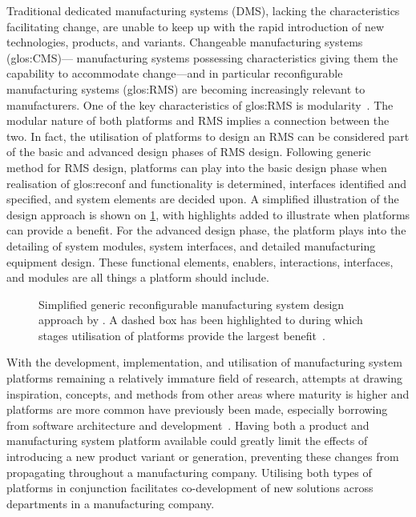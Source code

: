 Traditional dedicated manufacturing systems (DMS), lacking the characteristics facilitating change, are unable to keep up with the rapid introduction of new technologies, products, and variants.
Changeable manufacturing systems (\gls{glos:CMS})---\ie{} manufacturing systems possessing characteristics giving them the capability to accommodate change---and in particular reconfigurable manufacturing systems (\gls{glos:RMS}) are becoming increasingly relevant to manufacturers.
One of the key characteristics of \gls{glos:RMS} is modularity~\parencite{Koren,HodaC}.
The modular nature of both platforms and RMS implies a connection between the two.
In fact, the utilisation of platforms to design an RMS can be considered part of the basic and advanced design phases of RMS design.
Following  generic method for RMS design, platforms can play into the basic design phase when realisation of \gls{glos:reconf} and functionality is determined, interfaces identified and specified, and system elements are decided upon.
A simplified illustration of the design approach is shown on \cref{fig:pltfRMS}, with highlights added to illustrate when platforms can provide a benefit.
For the advanced design phase, the platform plays into the detailing of system modules, system interfaces, and detailed manufacturing equipment design.
These functional elements, enablers, interactions, interfaces, and modules are all things a platform should include.
\begin{figure}[tb]
	\centering
	\caption[Generic reconfigurable manufacturing system design approach.]
	{Simplified generic reconfigurable manufacturing system design approach by \textcite{Andersen2017179}.
	A dashed box has been highlighted to during which stages utilisation of platforms provide the largest benefit~\parencite{SorensenCMS2019}.}\label{fig:pltfRMS}
\end{figure}

With the development, implementation, and utilisation of manufacturing system platforms remaining a relatively immature field of research, attempts at drawing inspiration, concepts, and methods from other areas where maturity is higher and platforms are more common have previously been made, especially borrowing from software architecture and development~\parencite{SorensenMCPC2017,BENKAMOUN201488,JepsenPhD,BossenCMod}.
Having both a product and manufacturing system platform available could greatly limit the effects of introducing a new product variant or generation, preventing these changes from propagating throughout a manufacturing company.
Utilising both types of platforms in conjunction facilitates co-development of new solutions across departments in a manufacturing company.